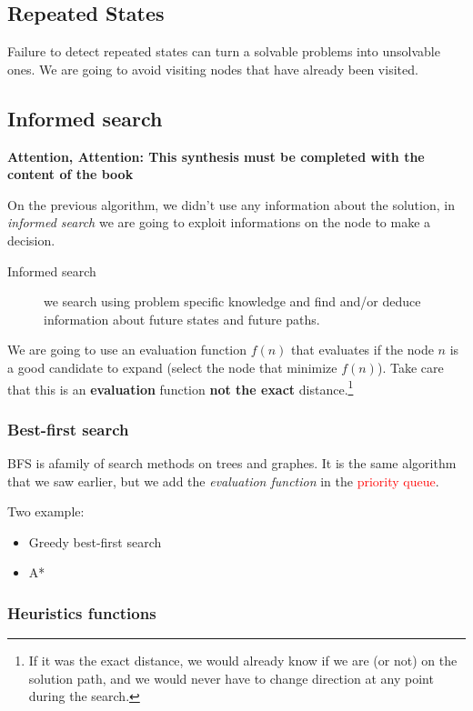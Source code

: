 \subsection{Repeated States}

Failure to detect repeated states can turn a solvable problems into unsolvable ones. We are going to avoid visiting nodes that have already been visited. 

\subsection{Informed search}

\textbf{Attention, Attention: This synthesis must be completed with the content of the book}

On the previous algorithm, we didn't use any information about the solution, in \textit{informed search} we are going to exploit informations on the node to make a decision.

\begin{description}
\item[Informed search] we search using problem specific knowledge and find and/or deduce information about future states and future paths.
\end{description}

We are going to use an evaluation function $f(n)$ that evaluates if the node $n$ is a good candidate to expand (select the node that minimize $f(n)$). Take care that this is an \textbf{evaluation} function \textbf{not the exact} distance.\footnote{If it was the exact distance, we would already know if we are (or not) on the solution path, and we would never have to change direction at any point during the search.}

\subsubsection{Best-first search}

BFS is afamily of search methods on trees and graphes. It is the same algorithm that we saw earlier, but we add the \textit{evaluation function} in the \textcolor{red}{priority queue}.

Two example:
\begin{itemize}
\item Greedy best-first search
\item A*
\end{itemize}

\subsubsection{Heuristics functions}

